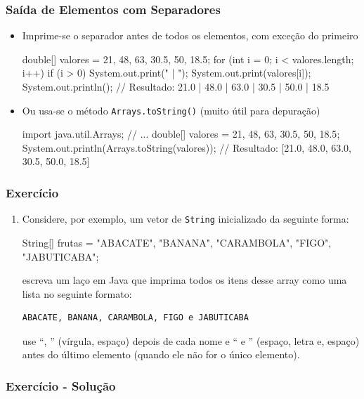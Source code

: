 \documentclass[xcolor={dvipsnames,table},aspectratio=169]{beamer}
\begin{document}
\begin{frame}[fragile]\frametitle{Saída de Elementos com Separadores}
\begin{itemize}
	\item Imprime-se o separador antes de todos os elementos, com exceção do primeiro
{\scriptsize
\begin{javacode}
double[] valores = {21, 48, 63, 30.5, 50, 18.5};
for (int i = 0; i < valores.length; i++) {
  if (i > 0) {  System.out.print(" | ");  }
  System.out.print(valores[i]);
}
System.out.println();
// Resultado: 21.0 | 48.0 | 63.0 | 30.5 | 50.0 | 18.5
\end{javacode}
}
\item Ou usa-se o método \texttt{Arrays.toString()} (muito útil para depuração)
{\scriptsize
\begin{javacode}
import java.util.Arrays;
// ...
double[] valores = {21, 48, 63, 30.5, 50, 18.5};
System.out.println(Arrays.toString(valores));
// Resultado: [21.0, 48.0, 63.0, 30.5, 50.0, 18.5]
\end{javacode}
}
\end{itemize}
\end{frame}

\begin{frame}[fragile]\frametitle{Exercício}
\begin{enumerate}
	\item Considere, por exemplo, um vetor de \texttt{String} inicializado da seguinte forma:
\begin{javacode}
String[] frutas = {"ABACATE", "BANANA", "CARAMBOLA",
                   "FIGO", "JABUTICABA"};
\end{javacode}
	escreva um laço em Java que imprima todos os itens desse array como uma lista no seguinte formato:
\begin{verbatim}
ABACATE, BANANA, CARAMBOLA, FIGO e JABUTICABA
\end{verbatim}
	use ``, '' (vírgula, espaço) depois de cada nome e `` e '' (espaço, letra e, espaço) antes do último elemento (quando ele não for o único elemento).
\end{enumerate}
\end{frame}

\begin{frame}[fragile]\frametitle{Exercício - Solução}
{\tiny\inputminted[bgcolor=cyan!10]{java}{src/Lista.java}}
\end{frame}
\end{document}
